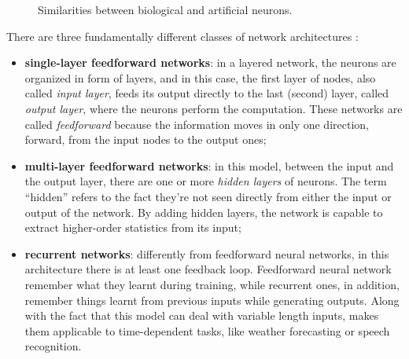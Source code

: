 \begin{center}
	\begin{figure}[ht!]
		\caption{Similarities between biological \cite{WikipediaNeuron} and artificial neurons.}
	\end{figure}
\end{center}
There are three fundamentally different classes of network architectures \cite{Hay08}:

\begin{itemize}
	\item \textbf{single-layer feedforward networks}: in a layered network, the neurons are organized in form of layers, and in this case, the first layer of nodes, also called \textit{input layer}, feeds its output directly to the last (second) layer, called \textit{output layer}, where the neurons perform the computation. These networks are called \textit{feedforward} because the information moves in only one direction, forward, from the input nodes to the output ones;
	\item \textbf{multi-layer feedforward networks}: in this model, between the input and the output layer, there are one or more \textit{hidden layers} of neurons. The term ``hidden'' refers to the fact they're not seen directly from either the input or output of the network. By adding hidden layers, the network is capable to extract higher-order statistics from its input;
	\item \textbf{recurrent networks}: differently from feedforward neural networks, in this architecture there is at least one feedback loop. Feedforward neural network remember what they learnt during training, while recurrent ones, in addition, remember things learnt from previous inputs while generating outputs. Along with the fact that this model can deal with variable length inputs, makes them applicable to time-dependent tasks, like weather forecasting or speech recognition.
\end{itemize}

